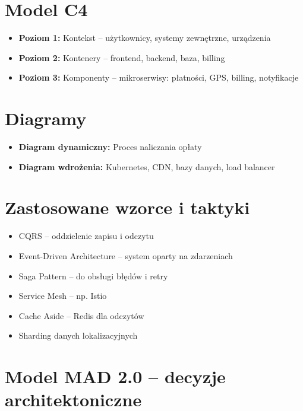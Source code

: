 \documentclass[a4paper,12pt]{article}
\theoremstyle{definition}
\begin{document}
\section{Model C4}

\begin{itemize}
  \item \textbf{Poziom 1:} Kontekst – użytkownicy, systemy zewnętrzne, urządzenia
  \item \textbf{Poziom 2:} Kontenery – frontend, backend, baza, billing
  \item \textbf{Poziom 3:} Komponenty – mikroserwisy: płatności, GPS, billing, notyfikacje
\end{itemize}

\section{Diagramy}

\begin{itemize}
  \item \textbf{Diagram dynamiczny:} Proces naliczania opłaty
  \item \textbf{Diagram wdrożenia:} Kubernetes, CDN, bazy danych, load balancer
\end{itemize}

\section{Zastosowane wzorce i taktyki}

\begin{itemize}
  \item CQRS – oddzielenie zapisu i odczytu
  \item Event-Driven Architecture – system oparty na zdarzeniach
  \item Saga Pattern – do obsługi błędów i retry
  \item Service Mesh – np. Istio
  \item Cache Aside – Redis dla odczytów
  \item Sharding danych lokalizacyjnych
\end{itemize}

\section{Model MAD 2.0 – decyzje architektoniczne}
\end{document}
